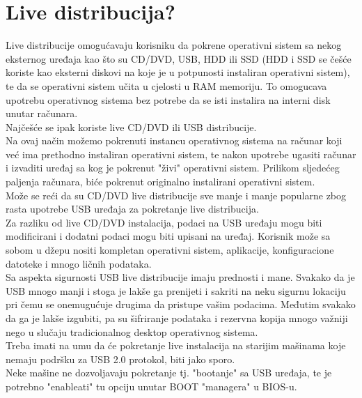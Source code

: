 \documentclass[12pt,vi]{mitthesis}
\begin{document}
\section*{Live distribucija?}
\indent
Live distribucije omogućavaju korisniku da pokrene operativni sistem sa nekog eksternog uređaja kao što su CD/DVD, USB, HDD ili SSD (HDD i SSD se češće koriste kao eksterni diskovi na koje je u potpunosti instaliran operativni sistem), te da se operativni sistem učita u cjelosti u RAM memoriju. To omogucava upotrebu operativnog sistema bez potrebe da se isti instalira na interni disk unutar računara.\\
\indent
Najčešće se ipak koriste live CD/DVD ili USB distribucije.\\
\indent
Na ovaj način možemo pokrenuti instancu operativnog sistema na računar koji već ima prethodno instaliran operativni sistem, te nakon upotrebe ugasiti računar i izvaditi uređaj sa kog je pokrenut "živi" operativni sistem. Prilikom sljedećeg paljenja računara, biće pokrenut originalno instalirani operativni sistem.\\
Može se reći da su CD/DVD live distribucije sve manje i manje popularne zbog rasta upotrebe USB uređaja za pokretanje live distribucija.\\
\indent
Za razliku od live CD/DVD instalacija, podaci na USB uređaju mogu biti modificirani i dodatni podaci mogu biti upisani na uređaj. Korisnik može sa sobom u džepu nositi kompletan operativni sistem, aplikacije, konfiguracione datoteke i mnogo ličnih podataka.\\
\indent
Sa aspekta sigurnosti USB live distribucije imaju prednosti i mane. Svakako da je USB mnogo manji i stoga je lakše ga prenijeti i sakriti na neku sigurnu lokaciju pri čemu se onemugućuje drugima da pristupe vašim podacima. Međutim svakako da ga je lakše izgubiti, pa su šifriranje podataka i rezervna kopija mnogo važniji nego u slučaju tradicionalnog desktop operativnog sistema.\\
\indent
Treba imati na umu da će pokretanje live instalacija na starijim mašinama koje nemaju podršku za USB 2.0 protokol, biti jako sporo.\\
Neke mašine ne dozvoljavaju pokretanje tj. "bootanje" sa USB uređaja, te je potrebno "enableati" tu opciju unutar BOOT "managera" u BIOS-u.
\end{document}
